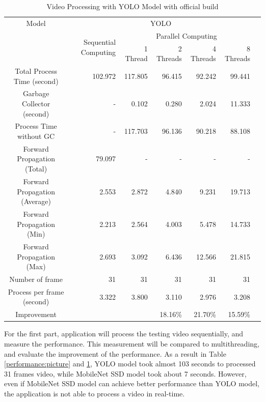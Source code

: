             \begin{table}[!htp]\centering
                \scriptsize
                \begin{tabular}{lrrrrrrr}\toprule
                    \multicolumn{2}{c}{Model} &\multicolumn{5}{c}{YOLO} \\\cmidrule{1-7}
                    \multicolumn{2}{c}{\multirow{2}{*}{}} &\multirow{2}{*}{Sequential Computing} &\multicolumn{4}{c}{Parallel Computing} \\\cmidrule{4-7}
                    & & &1 Thread &2 Threads &4 Threads &8 Threads \\\midrule
                    \multicolumn{2}{c}{Total Process Time (second)} &102.972 &117.805 &96.415 &92.242 &99.441 \\
                    \multicolumn{2}{c}{Garbage Collector (second)} &- &0.102 &0.280 &2.024 &11.333 \\
                    \multicolumn{2}{c}{Process Time without GC} &- &117.703 &96.136 &90.218 &88.108 \\
                    \multicolumn{2}{c}{Forward Propagation (Total)} &79.097 &- &- &- &- \\
                    \multicolumn{2}{c}{Forward Propagation (Average)} &2.553 &2.872 &4.840 &9.231 &19.713 \\
                    \multicolumn{2}{c}{Forward Propagation (Min)} &2.213 &2.564 &4.003 &5.478 &14.733 \\
                    \multicolumn{2}{c}{Forward Propagation (Max)} &2.693 &3.092 &6.436 &12.566 &21.815 \\
                    \multicolumn{2}{c}{Number of frame} &31 &31 &31 &31 &31 \\
                    \multicolumn{2}{c}{Process per frame (second)} &3.322 &3.800 &3.110 &2.976 &3.208 \\
                    \multicolumn{2}{c}{Improvement} & & &18.16\% &21.70\% &15.59\% \\
                    \bottomrule
                \end{tabular}

                \caption{Video Processing with YOLO Model with official build}\label{yolo:official-performace}
            \end{table}


            For the first part, application will process the testing video sequentially, and measure the performance.
            This measurement will be compared to multithreading, and evaluate the improvement of the performance.
            As a result in Table \ref{performance:picture} and \ref{yolo:official-performace}, YOLO model took almost 103 seconds to processed 31 frames video, while MobileNet SSD model took about 7 seconds.
            However, even if MobileNet SSD model can achieve better performance than YOLO model, the application is not able to process a video in real-time.

